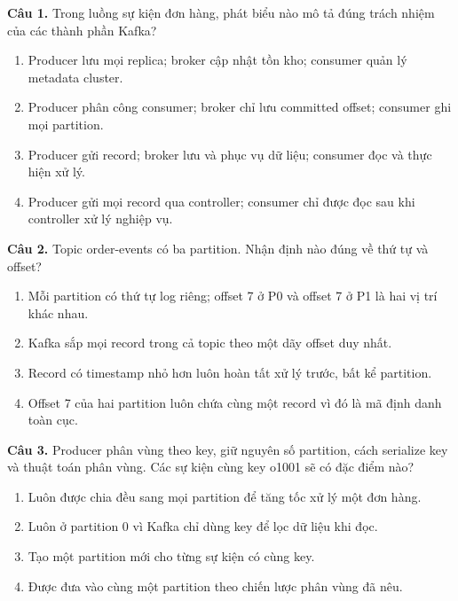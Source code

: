 \noindent\begin{minipage}{\linewidth}
\small
\textbf{Câu 1.} Trong luồng sự kiện đơn hàng, phát biểu nào mô tả đúng trách nhiệm của các thành phần Kafka?
\begin{enumerate}[label=\textbf{\Alph*.},leftmargin=2em,itemsep=0pt,topsep=2pt]
\item Producer lưu mọi replica; broker cập nhật tồn kho; consumer quản lý metadata cluster.
\item Producer phân công consumer; broker chỉ lưu committed offset; consumer ghi mọi partition.
\item Producer gửi record; broker lưu và phục vụ dữ liệu; consumer đọc và thực hiện xử lý.
\item Producer gửi mọi record qua controller; consumer chỉ được đọc sau khi controller xử lý nghiệp vụ.
\end{enumerate}
\end{minipage}\par\addvspace{0.5em}

\noindent\begin{minipage}{\linewidth}
\small
\textbf{Câu 2.} Topic order-events có ba partition. Nhận định nào đúng về thứ tự và offset?
\begin{enumerate}[label=\textbf{\Alph*.},leftmargin=2em,itemsep=0pt,topsep=2pt]
\item Mỗi partition có thứ tự log riêng; offset 7 ở P0 và offset 7 ở P1 là hai vị trí khác nhau.
\item Kafka sắp mọi record trong cả topic theo một dãy offset duy nhất.
\item Record có timestamp nhỏ hơn luôn hoàn tất xử lý trước, bất kể partition.
\item Offset 7 của hai partition luôn chứa cùng một record vì đó là mã định danh toàn cục.
\end{enumerate}
\end{minipage}\par\addvspace{0.5em}

\noindent\begin{minipage}{\linewidth}
\small
\textbf{Câu 3.} Producer phân vùng theo key, giữ nguyên số partition, cách serialize key và thuật toán phân vùng. Các sự kiện cùng key o1001 sẽ có đặc điểm nào?
\begin{enumerate}[label=\textbf{\Alph*.},leftmargin=2em,itemsep=0pt,topsep=2pt]
\item Luôn được chia đều sang mọi partition để tăng tốc xử lý một đơn hàng.
\item Luôn ở partition 0 vì Kafka chỉ dùng key để lọc dữ liệu khi đọc.
\item Tạo một partition mới cho từng sự kiện có cùng key.
\item Được đưa vào cùng một partition theo chiến lược phân vùng đã nêu.
\end{enumerate}
\end{minipage}\par\addvspace{0.5em}

